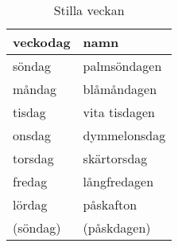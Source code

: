 \documentclass[a4paper, article]{memoir}
\begin{document}
\begin{table}[ht]  
\centering
\begin{tabular}{ll}
\toprule
veckodag & namn \\
\midrule
söndag & palmsöndagen \\
måndag & blåmåndagen \\
tisdag & vita tisdagen \\
onsdag & dymmelonsdag \\
torsdag & skärtorsdag \\
fredag & långfredagen \\
lördag & påskafton \\
(söndag) & (påskdagen) \\
\bottomrule
\end{tabular}
\caption{Stilla veckan}
\label{tab:stilla}
\end{table}
\end{document}
